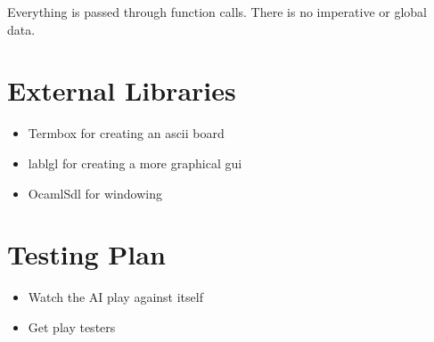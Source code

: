 \documentclass[11pt, oneside]{article}
\begin{document}
Everything is passed through function calls. There is no imperative or global
data.

\section{External Libraries}
\begin{itemize}
\item Termbox for creating an ascii board
\item lablgl for creating a more graphical gui
\item OcamlSdl for windowing
\end{itemize}

\section{Testing Plan}
\begin{itemize}
\item Watch the AI play against itself
\item Get play testers
\end{itemize}
\end{document}
